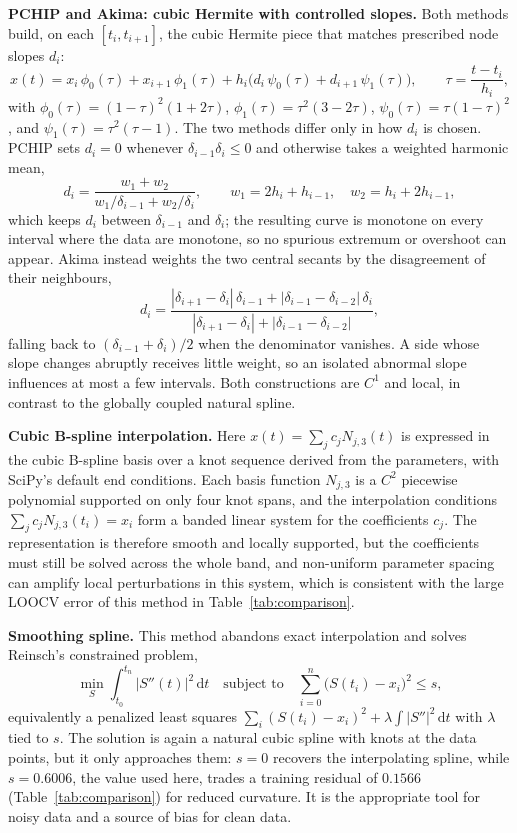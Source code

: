 \documentclass[a4paper,11pt]{article}
\begin{document}
\textbf{PCHIP and Akima: cubic Hermite with controlled slopes.}  Both methods
build, on each $[t_i,t_{i+1}]$, the cubic Hermite piece that matches prescribed
node slopes $d_i$:
\[
x(t)=x_i\,\phi_0(\tau)+x_{i+1}\,\phi_1(\tau)
+h_i\big(d_i\,\psi_0(\tau)+d_{i+1}\,\psi_1(\tau)\big),\qquad
\tau=\frac{t-t_i}{h_i},
\]
with $\phi_0(\tau)=(1-\tau)^2(1+2\tau)$, $\phi_1(\tau)=\tau^2(3-2\tau)$,
$\psi_0(\tau)=\tau(1-\tau)^2$, and $\psi_1(\tau)=\tau^2(\tau-1)$.  The two
methods differ only in how $d_i$ is chosen.  PCHIP sets $d_i=0$ whenever
$\delta_{i-1}\delta_i\le 0$ and otherwise takes a weighted harmonic mean,
\[
d_i=\frac{w_1+w_2}{w_1/\delta_{i-1}+w_2/\delta_i},\qquad
w_1=2h_i+h_{i-1},\quad w_2=h_i+2h_{i-1},
\]
which keeps $d_i$ between $\delta_{i-1}$ and $\delta_i$; the resulting curve is
monotone on every interval where the data are monotone, so no spurious extremum
or overshoot can appear.  Akima instead weights the two central secants by the
disagreement of their neighbours,
\[
d_i=\frac{|\delta_{i+1}-\delta_i|\,\delta_{i-1}
+|\delta_{i-1}-\delta_{i-2}|\,\delta_i}
{|\delta_{i+1}-\delta_i|+|\delta_{i-1}-\delta_{i-2}|},
\]
falling back to $(\delta_{i-1}+\delta_i)/2$ when the denominator vanishes.  A
side whose slope changes abruptly receives little weight, so an isolated
abnormal slope influences at most a few intervals.  Both constructions are
$C^1$ and local, in contrast to the globally coupled natural spline.

\textbf{Cubic B-spline interpolation.}  Here
$x(t)=\sum_j c_j N_{j,3}(t)$ is expressed in the cubic B-spline basis over a
knot sequence derived from the parameters, with SciPy's default end conditions.
Each basis function $N_{j,3}$ is a $C^2$ piecewise polynomial supported on only
four knot spans, and the interpolation conditions
$\sum_j c_j N_{j,3}(t_i)=x_i$ form a banded linear system for the coefficients
$c_j$.  The representation is therefore smooth and locally supported, but the
coefficients must still be solved across the whole band, and non-uniform
parameter spacing can amplify local perturbations in this system, which is
consistent with the large LOOCV error of this method in
Table~\ref{tab:comparison}.

\textbf{Smoothing spline.}  This method abandons exact interpolation and solves
Reinsch's constrained problem,
\[
\min_S \int_{t_0}^{t_n}|S''(t)|^2\,\mathrm dt
\quad\text{subject to}\quad
\sum_{i=0}^{n}\big(S(t_i)-x_i\big)^2\le s,
\]
equivalently a penalized least squares $\sum_i (S(t_i)-x_i)^2
+\lambda\int|S''|^2\,\mathrm dt$ with $\lambda$ tied to $s$.  The solution is
again a natural cubic spline with knots at the data points, but it only
approaches them: $s=0$ recovers the interpolating spline, while $s=0.6006$,
the value used here, trades a training residual of $0.1566$
(Table~\ref{tab:comparison}) for reduced curvature.  It is the appropriate tool
for noisy data and a source of bias for clean data.
\end{document}
